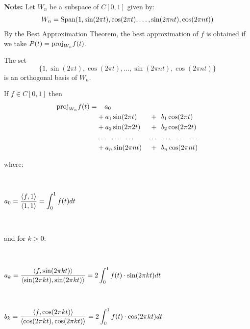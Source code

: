 {\vfill
{\bf Note:} Let $W_{n}$ be a subspace of $C[0,1]$ given by:
$$W_{n} = \text{Span}(1, \sin(2\pi t), \cos(2\pi t), \dots, \sin(2\pi nt), \cos(2\pi nt))$$
By the Best Approximation Theorem, the best approximation of $f$ is obtained 
if we take $P(t) = \text{proj}_{W_{n}}f(t)$.

\newpage


\begin{cbox}[Theorem]
The set 
$$\{1, \sin(2\pi t), \cos(2\pi t), \dots, \sin(2\pi nt), \cos(2\pi nt)\}$$
is an orthogonal basis of $W_{n}$. 
\end{cbox}

\vskip 2mm

\begin{cbox}[Corollary]
If $f\in C[0, 1]$ then 
\begin{alignat*}{3}
\proj_{W_{n}}f(t) = & \phantom{+} \ a_{0} && \\
  & + a_{1}\sin(2\pi t) &\  + \ \ & b_{1}\cos(2\pi t) \\
  & + a_{2}\sin(2\pi 2t) &\  + \ \ & b_{2}\cos(2\pi 2t) \\
  & \dots \ \ \dots \ \ \dots \ \ & \dots\ \  & \dots \ \ \dots \ \ \dots \\
  & + a_{n}\sin(2\pi nt) &\  + \ \ & b_{n}\cos(2\pi nt) \\
\end{alignat*}

\vskip -5mm

where:

\ 

\vskip 2mm

$\displaystyle a_{0} = \frac{\langle f, 1\rangle} {\langle1, 1\rangle} = \int_{0}^{1} f(t) dt$

\ 

\vskip 2mm


and for $k>0$:

\ 

\vskip 2mm

$\displaystyle a_{k} = \frac{\langle f, \sin(2\pi kt)\rangle} {\langle\sin(2\pi kt), \sin(2\pi kt)\rangle} 
= 2 \int_{0}^{1} f(t)\cdot \sin(2\pi kt) dt$

\ 

\vskip 2mm

$\displaystyle b_{k} = \frac{\langle f, \cos(2\pi kt)\rangle} {\langle\cos(2\pi kt), \cos(2\pi kt)\rangle} 
= 2 \int_{0}^{1} f(t)\cdot \cos(2\pi kt) dt$

\end{cbox}


\newpage

}
